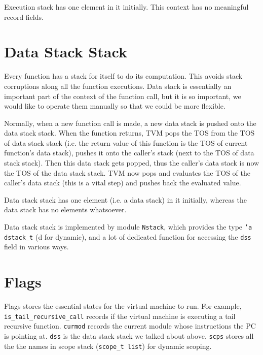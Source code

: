 \documentclass{report}
\begin{document}
\begin{mdframed}[style=detail]
  Execution stack has one element in it initially. This context has no
  meaningful record fields.
\end{mdframed}

\section{Data Stack Stack}

Every function has a stack for itself to do its computation. This avoids stack corruptions along all the function executions. Data stack is essentially an important part of the context of the function call, but it is so important, we would like to operate them manually so that we could be more flexible.

Normally, when a new function call is made, a new data stack is pushed onto the data stack stack. When the function returns, TVM pops the TOS from the TOS of data stack stack (i.e. the return value of this function is the TOS of current function's data stack), pushes it onto the caller's stack (next to the TOS of data stack stack). Then this data stack gets popped, thus the caller's data stack is now the TOS of the data stack stack. TVM now pops and evaluates the TOS of the caller's data stack (this is a vital step) and pushes back the evaluated value.

\begin{mdframed}[style=detail]
  Data stack stack has one element (i.e. a data stack) in it
  initially, whereas the data stack has no elements whatsoever.

  Data stack stack is implemented by module \texttt{Nstack}, which
  provides the type \texttt{'a dstack\_t} (d for dynamic), and a lot
  of dedicated function for accessing the \texttt{dss} field in
  various ways.
\end{mdframed}

\section{Flags}

Flags stores the essential states for the virtual machine to run. For example, \texttt{is\_tail\_recursive\_call} records if the virtual machine is executing a tail recursive function. \texttt{curmod} records the current module whose instructions the PC is pointing at. \texttt{dss} is the data stack stack we talked about above. \texttt{scps} stores all the the names in scope stack (\texttt{scope\_t list}) for dynamic scoping.
\end{document}
